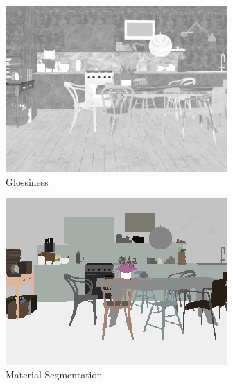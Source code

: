\begin{figure}
\begin{subfigure}{0.3\linewidth}
    \includegraphics[width=\linewidth]{praca/images/AI43_001_Cam01.VRayMtlReflectGlossiness.png}
    \caption{Glossiness}
  \end{subfigure}
  \begin{subfigure}{0.3\linewidth}
    \includegraphics[width=\linewidth]{praca/images/AI43_001_Cam01.VRayMtlID.png}
    \caption{Material Segmentation}
  \end{subfigure}
  \begin{subfigure}{0.3\linewidth}

\end{subfigure}
\end{figure}

